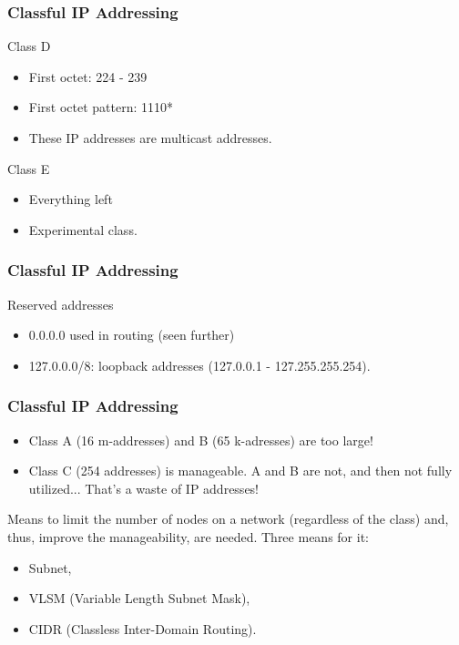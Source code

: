   \begin{frame}
    \frametitle{Classful IP Addressing}
    \begin{block}{Class D}
      \begin{itemize}
	\item First octet: {\color{ForestGreen}224} - {\color{ForestGreen}239}
	\item First octet pattern: {\color{ForestGreen}1110*}
	\item These IP addresses are multicast addresses.
      \end{itemize}
    \end{block}
    \begin{block}{Class E}
      \begin{itemize}
	\item Everything left
	\item Experimental class.
      \end{itemize}
    \end{block}
  \end{frame}

  \begin{frame}
    \frametitle{Classful IP Addressing}
    \begin{block}{Reserved addresses}
      \begin{itemize}
	\item 0.0.0.0 used in routing (seen further)
	\item {\color{ForestGreen}127}.{\color{blue}0.0.0}{\color{brown}/8}: loopback addresses ({\color{ForestGreen}127}.{\color{blue}0.0.1} - {\color{ForestGreen}127}.{\color{blue}255.255.254}).
      \end{itemize}
    \end{block}
  \end{frame}

  \begin{frame}
    \frametitle{Classful IP Addressing}
    \begin{itemize}
      \item Class A (16 m-addresses) and B (65 k-adresses) are too large!
      \item Class C (254 addresses) is manageable. A and B are not, and then not fully utilized... That's a waste of IP addresses!
    \end{itemize}
    Means to limit the number of nodes on a network (regardless of the class) and, thus, improve the manageability, are needed. Three means for it:
    \begin{itemize}
      \item Subnet,
      \item VLSM (Variable Length Subnet Mask),
      \item CIDR (Classless Inter-Domain Routing).
    \end{itemize}
  \end{frame}

